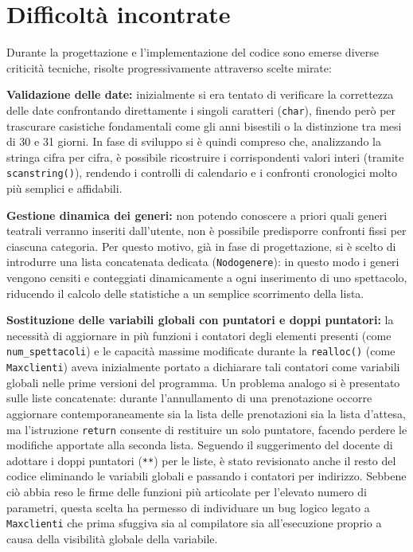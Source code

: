 \documentclass[11pt,a4paper,oneside,openany]{book}
\newenvironment{listacomp}{%
    \small
    \begin{list}{\textendash}{%
        \setlength{\topsep}{2pt}%
        \setlength{\partopsep}{0pt}%
        \setlength{\itemsep}{1pt}%
        \setlength{\parsep}{0pt}%
        \setlength{\leftmargin}{1.2em}%
    }%
}{%
    \end{list}%
}
\begin{document}
\section{Difficoltà incontrate}
Durante la progettazione e l'implementazione del codice sono emerse diverse criticità tecniche, risolte progressivamente attraverso scelte mirate:
\begin{listacomp}
    \item \textbf{Validazione delle date:} inizialmente si era tentato di verificare la correttezza delle date confrontando direttamente i singoli caratteri (\texttt{char}), finendo però per trascurare casistiche fondamentali come gli anni bisestili o la distinzione tra mesi di 30 e 31 giorni. In fase di sviluppo si è quindi compreso che, analizzando la stringa cifra per cifra, è possibile ricostruire i corrispondenti valori interi (tramite \texttt{scanstring()}), rendendo i controlli di calendario e i confronti cronologici molto più semplici e affidabili.
    \item \textbf{Gestione dinamica dei generi:} non potendo conoscere a priori quali generi teatrali verranno inseriti dall'utente, non è possibile predisporre confronti fissi per ciascuna categoria. Per questo motivo, già in fase di progettazione, si è scelto di introdurre una lista concatenata dedicata (\texttt{Nodogenere}): in questo modo i generi vengono censiti e conteggiati dinamicamente a ogni inserimento di uno spettacolo, riducendo il calcolo delle statistiche a un semplice scorrimento della lista.
    \item \textbf{Sostituzione delle variabili globali con puntatori e doppi puntatori:} la necessità di aggiornare in più funzioni i contatori degli elementi presenti (come \texttt{num\_spettacoli}) e le capacità massime modificate durante la \texttt{realloc()} (come \texttt{Maxclienti}) aveva inizialmente portato a dichiarare tali contatori come variabili globali nelle prime versioni del programma. Un problema analogo si è presentato sulle liste concatenate: durante l'annullamento di una prenotazione occorre aggiornare contemporaneamente sia la lista delle prenotazioni sia la lista d'attesa, ma l'istruzione \texttt{return} consente di restituire un solo puntatore, facendo perdere le modifiche apportate alla seconda lista. Seguendo il suggerimento del docente di adottare i doppi puntatori (\texttt{**}) per le liste, è stato revisionato anche il resto del codice eliminando le variabili globali e passando i contatori per indirizzo. Sebbene ciò abbia reso le firme delle funzioni più articolate per l'elevato numero di parametri, questa scelta ha permesso di individuare un bug logico legato a \texttt{Maxclienti} che prima sfuggiva sia al compilatore sia all'esecuzione proprio a causa della visibilità globale della variabile.
\end{listacomp}
\end{document}

